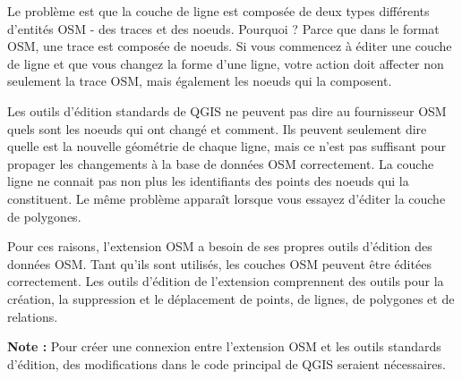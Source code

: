 Le problème est que la couche de ligne est composée de deux types différents d'entités OSM - des traces et des noeuds. Pourquoi ? Parce que dans le format OSM, une trace est composée de noeuds. Si vous commencez à éditer une couche de ligne et que vous changez la forme d'une ligne, votre action doit affecter non seulement la trace OSM, mais également les noeuds qui la composent.

Les outils d'édition standards de QGIS ne peuvent pas dire au fournisseur OSM quels sont les noeuds qui ont changé et comment. Ils peuvent seulement dire quelle est la nouvelle géométrie de chaque ligne, mais ce n'est pas suffisant pour propager les changements à la base de données OSM correctement. La couche ligne ne connait pas non plus les identifiants des points des noeuds qui la constituent. Le même problème apparaît lorsque vous essayez d'éditer la couche de polygones.

Pour ces raisons, l'extension OSM a besoin de ses propres outils d'édition des données OSM. Tant qu'ils sont utilisés, les couches OSM peuvent être éditées correctement. Les outils d'édition de l'extension comprennent des outils pour la création, la suppression et le déplacement de points, de lignes, de polygones et de relations.

\textbf{Note :} Pour créer une connexion entre l'extension OSM et les outils standards d'édition, des modifications dans le code principal de QGIS seraient nécessaires. 

